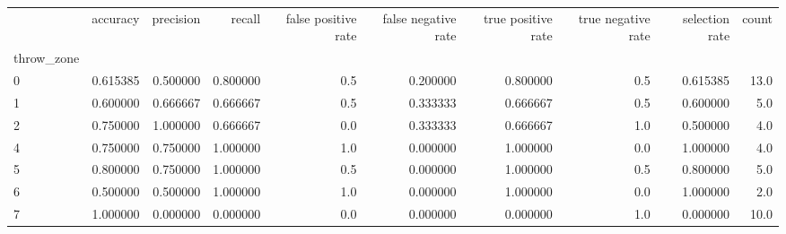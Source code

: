 \begin{tabular}{lrrrrrrrrr}
\toprule
{} &  accuracy &  precision &    recall &  false positive rate &  false negative rate &  true positive rate &  true negative rate &  selection rate &  count \\
throw\_zone &           &            &           &                      &                      &                     &                     &                 &        \\
\midrule
0          &  0.615385 &   0.500000 &  0.800000 &                  0.5 &             0.200000 &            0.800000 &                 0.5 &        0.615385 &   13.0 \\
1          &  0.600000 &   0.666667 &  0.666667 &                  0.5 &             0.333333 &            0.666667 &                 0.5 &        0.600000 &    5.0 \\
2          &  0.750000 &   1.000000 &  0.666667 &                  0.0 &             0.333333 &            0.666667 &                 1.0 &        0.500000 &    4.0 \\
4          &  0.750000 &   0.750000 &  1.000000 &                  1.0 &             0.000000 &            1.000000 &                 0.0 &        1.000000 &    4.0 \\
5          &  0.800000 &   0.750000 &  1.000000 &                  0.5 &             0.000000 &            1.000000 &                 0.5 &        0.800000 &    5.0 \\
6          &  0.500000 &   0.500000 &  1.000000 &                  1.0 &             0.000000 &            1.000000 &                 0.0 &        1.000000 &    2.0 \\
7          &  1.000000 &   0.000000 &  0.000000 &                  0.0 &             0.000000 &            0.000000 &                 1.0 &        0.000000 &   10.0 \\
\bottomrule
\end{tabular}
